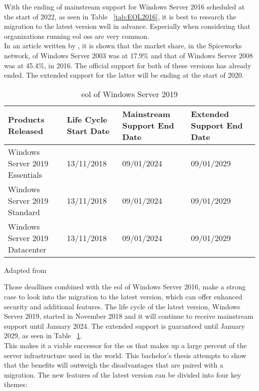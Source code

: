 With the ending of mainstream support for Windows Server 2016 scheduled at the start of 2022, as seen in Table ~\ref{tab:EOL2016}, it is best to research the migration to the latest version well in advance. 
Especially when considering that organizations running \acrfull{eol} \acrshort{os}s are very common. \\
In an article written by \textcite{Tsai2016}, it is shown that the market share, in the Spiceworks network, of Windows Server 2003 was at 17.9\% and that of Windows Server 2008 was at 45.4\%, in 2016. 
The official support for both of these versions has already ended. The extended support for the latter will be ending at the start of 2020. 

\begin{table}[ht]
	\centering
	\begin{adjustbox}{width=1\textwidth}
		\begin{tabular}{l|l|l|ll}
			Products Released & Life Cycle Start Date & Mainstream Support End Date & Extended Support End Date &\\
			\hline
			Windows Server 2019 Essentials & 13/11/2018 & 09/01/2024 & 09/01/2029 &\\
			Windows Server 2019 Standard & 13/11/2018 & 09/01/2024 & 09/01/2029 &\\
			Windows Server 2019 Datacenter & 13/11/2018 & 09/01/2024 & 09/01/2029 &\\
		\end{tabular}
	\end{adjustbox}
	\caption[\acrshort{eol} \acrshort{ws}2019]{\acrshort{eol} of Windows Server 2019}
	\scriptsize	
	Adapted from \cite{MicrosoftEOL2019}
	\label{tab:EOL2019}
\end{table}

Those deadlines combined with the \acrshort{eol} of Windows Server 2016, make a strong case to look into the migration to the latest version, which can offer enhanced security and additional features. 
The life cycle of the latest version, Windows Server 2019, started in November 2018 and it will continue to receive mainstream support until January 2024. 
The extended support is guaranteed until January 2029, as seen in Table ~\ref{tab:EOL2019}.\\
This makes it a viable successor for the \acrshort{os} that makes up a large percent of the server infrastructure used in the world. 
This bachelor's thesis attempts to show that the benefits will outweigh the disadvantages that are paired with a migration. 
The new features of the latest version can be divided into four key themes:

